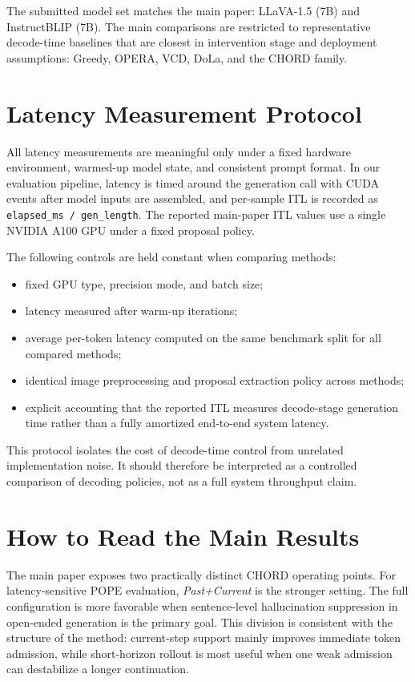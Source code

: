\documentclass[sigconf,anonymous,nonacm]{acmart}
\begin{document}
The submitted model set matches the main paper: LLaVA-1.5 (7B) and InstructBLIP (7B). The main comparisons are restricted to representative decode-time baselines that are closest in intervention stage and deployment assumptions: Greedy, OPERA, VCD, DoLa, and the CHORD family.

\section{Latency Measurement Protocol}
\label{sec:supp_latency}

All latency measurements are meaningful only under a fixed hardware environment, warmed-up model state, and consistent prompt format. In our evaluation pipeline, latency is timed around the generation call with CUDA events after model inputs are assembled, and per-sample ITL is recorded as \texttt{elapsed\_ms / gen\_length}. The reported main-paper ITL values use a single NVIDIA A100 GPU under a fixed proposal policy.

The following controls are held constant when comparing methods:
\begin{itemize}
    \item fixed GPU type, precision mode, and batch size;
    \item latency measured after warm-up iterations;
    \item average per-token latency computed on the same benchmark split for all compared methods;
    \item identical image preprocessing and proposal extraction policy across methods;
    \item explicit accounting that the reported ITL measures decode-stage generation time rather than a fully amortized end-to-end system latency.
\end{itemize}

This protocol isolates the cost of decode-time control from unrelated implementation noise. It should therefore be interpreted as a controlled comparison of decoding policies, not as a full system throughput claim.

\section{How to Read the Main Results}
\label{sec:supp_reading}

The main paper exposes two practically distinct CHORD operating points. For latency-sensitive POPE evaluation, \textit{Past+Current} is the stronger setting. The full configuration is more favorable when sentence-level hallucination suppression in open-ended generation is the primary goal. This division is consistent with the structure of the method: current-step support mainly improves immediate token admission, while short-horizon rollout is most useful when one weak admission can destabilize a longer continuation.
\end{document}
